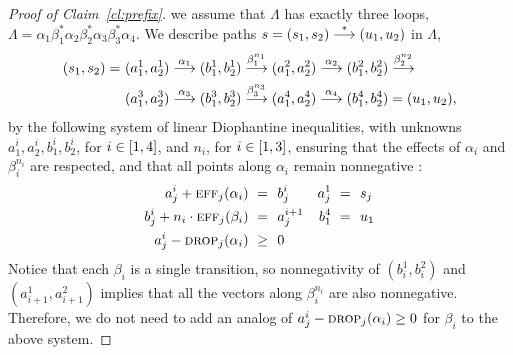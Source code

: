 \begin{appendixproof}
\begin{proof}[Proof of Claim~\ref{cl:prefix}]
\Wlog we assume that $\Lambda$ has exactly three loops, 
$\Lambda = \alpha_1\beta_1^{*}\alpha_2\beta_2^{*}\alpha_3\beta_3^{*}\alpha_4$. 
We describe paths $s = (s_1, s_2) \stackrel{*}{\longrightarrow} (u_1, u_2)$ in $\Lambda$,
\begin{align*}
(s_1, s_2) = \ & 
(a^1_1, a^1_2) \stackrel{\alpha_1}{\longrightarrow} (b^1_1, b^1_2) \stackrel{\beta_1^{n_1}}{\longrightarrow}
(a^2_1, a^2_2) \stackrel{\alpha_2}{\longrightarrow} (b^2_1, b^2_2) \stackrel{\beta_2^{n_2}}{\longrightarrow} \\
& (a^3_1, a^3_2) \stackrel{\alpha_3}{\longrightarrow} (b^3_1, b^3_2) \stackrel{\beta_3^{n_3}}{\longrightarrow}
(a^4_1, a^4_2) \stackrel{\alpha_4}{\longrightarrow} (b^4_1, b^4_2) = (u_1, u_2),
\end{align*}
by the following system of linear Diophantine inequalities, with unknowns 
$a^{i}_1, a^{i}_2, b^{i}_1, b^{i}_2$, for $i\in[1, 4]$, and $n_i$, for $i\in[1, 3]$,
ensuring that the effects of $\alpha_i$ and $\beta_i^{n_i}$ are respected, 
and that all points along $\alpha_i$ remain nonnegative 
:
%
%
%
%
\begin{align*}
a^{i}_j + \eff_j(\alpha_i) \ = \ & \ b^{i}_j  & a^1_j \ = \ & \ s_j \\
b^{i}_j + n_i \cdot \eff_j(\beta_i) \ = \ & \ a^{i+1}_j & b^4_1 \ = \ & \ u_1 \\
a^i_j - \drop_j(\alpha_i) \ \geq \ & \ 0 
\end{align*}
%
Notice that each $\beta_i$ is a single transition, so nonnegativity of $(b_i^1, b_i^2)$ and $(a_{i+1}^1, a_{i+1}^2)$
implies that all the vectors along  $\beta_i^{n_i}$ are also nonnegative. Therefore, we do not need to
add an analog of $a^i_j - \textsc{drop}_j(\alpha_i) \geq 0$ for $\beta_i$ to the above system.
%

\end{proof}
\end{appendixproof}
